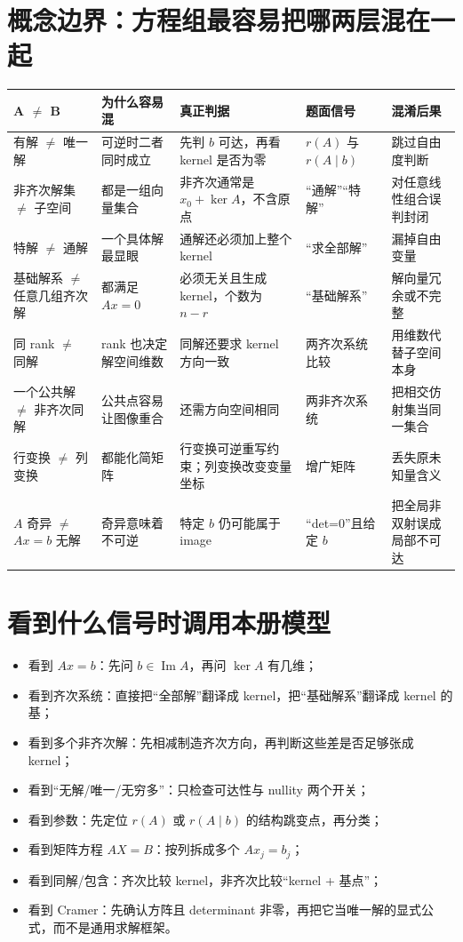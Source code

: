 \documentclass[11pt,a4paper]{ctexart}
\begin{document}
\section{概念边界：方程组最容易把哪两层混在一起}

\noindent\begin{tabularx}{\linewidth}{L{2.2cm}L{2.5cm}Y L{2.4cm}Y}
\toprule
\textbf{A $\neq$ B} & \textbf{为什么容易混} & \textbf{真正判据} & \textbf{题面信号} & \textbf{混淆后果}\\
\midrule
有解 $\neq$ 唯一解 & 可逆时二者同时成立 & 先判 $b$ 可达，再看 kernel 是否为零 & $r(A)$ 与 $r(A\mid b)$ & 跳过自由度判断\\
非齐次解集 $\neq$ 子空间 & 都是一组向量集合 & 非齐次通常是 $x_0+\ker A$，不含原点 & “通解”“特解” & 对任意线性组合误判封闭\\
特解 $\neq$ 通解 & 一个具体解最显眼 & 通解还必须加上整个 kernel & “求全部解” & 漏掉自由变量\\
基础解系 $\neq$ 任意几组齐次解 & 都满足 $Ax=0$ & 必须无关且生成 kernel，个数为 $n-r$ & “基础解系” & 解向量冗余或不完整\\
同 rank $\neq$ 同解 & rank 也决定解空间维数 & 同解还要求 kernel 方向一致 & 两齐次系统比较 & 用维数代替子空间本身\\
一个公共解 $\neq$ 非齐次同解 & 公共点容易让图像重合 & 还需方向空间相同 & 两非齐次系统 & 把相交仿射集当同一集合\\
行变换 $\neq$ 列变换 & 都能化简矩阵 & 行变换可逆重写约束；列变换改变变量坐标 & 增广矩阵 & 丢失原未知量含义\\
$A$ 奇异 $\neq$ $Ax=b$ 无解 & 奇异意味着不可逆 & 特定 $b$ 仍可能属于 image & “det=0”且给定 $b$ & 把全局非双射误成局部不可达\\
\bottomrule
\end{tabularx}

\section{看到什么信号时调用本册模型}

\begin{itemize}
  \item 看到 $Ax=b$：先问 $b\in\operatorname{Im}A$，再问 $\ker A$ 有几维；
  \item 看到齐次系统：直接把“全部解”翻译成 kernel，把“基础解系”翻译成 kernel 的基；
  \item 看到多个非齐次解：先相减制造齐次方向，再判断这些差是否足够张成 kernel；
  \item 看到“无解/唯一/无穷多”：只检查可达性与 nullity 两个开关；
  \item 看到参数：先定位 $r(A)$ 或 $r(A\mid b)$ 的结构跳变点，再分类；
  \item 看到矩阵方程 $AX=B$：按列拆成多个 $Ax_j=b_j$；
  \item 看到同解/包含：齐次比较 kernel，非齐次比较“kernel + 基点”；
  \item 看到 Cramer：先确认方阵且 determinant 非零，再把它当唯一解的显式公式，而不是通用求解框架。
\end{itemize}
\end{document}
